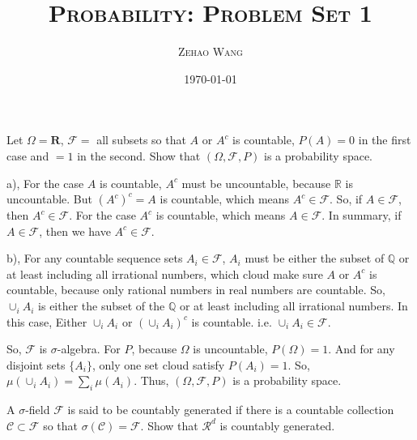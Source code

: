 \documentclass[en, normal, 11pt, black]{elegantnote}
\title{\textsc{Probability: Problem Set 1}}
\author{\textsc{Zehao Wang}}
\date{\today}
\newenvironment{exercise}[1]{\begin{tcolorbox}[colback=black!15, colframe=black!80, breakable, title=#1]}{\end{tcolorbox}}
\renewenvironment{proof}{\begin{tcolorbox}[colback=white, colframe=black!50, breakable, title=Proof. ]\setlength{\parskip}{0.8em}}{\\\rightline{$\square$}\end{tcolorbox}}
\begin{document}
\maketitle
    \begin{exercise}{1.1.1}
        Let $\Omega=\mathbf{R}$, $\mathcal{F}=$ all subsets so that $A$ or $A^c$ is countable, $P(A) = 0$ in the first case and $= 1$ in the second. Show that $(\Omega,\mathcal{F},P)$ is a probability space. 
    \end{exercise}
    \begin{proof}
        a), For the case $A$ is countable, $A^c$ must be uncountable, because $\mathbb{R}$ is uncountable. But $(A^c)^c=A$ is countable, which means $A^c\in\mathcal{F}$. So, if $A\in\mathcal{F}$, then $A^c\in\mathcal{F}$. For the case $A^c$ is countable, which means $A\in\mathcal{F}$. In summary, if $A\in\mathcal{F}$, then we have $A^c\in\mathcal{F}$. 

        b), For any countable sequence sets $A_i\in\mathcal{F}$, $A_i$ must be either the subset of $\mathbb{Q}$ or at least including all irrational numbers, which cloud make sure $A$ or $A^c$ is countable, because only rational numbers in real numbers are countable. So, $\cup_iA_i$ is either the subset of the $\mathbb{Q}$ or at least including all irrational numbers. In this case, Either $\cup_iA_i$ or $(\cup_iA_i)^c$ is countable. i.e. $\cup_iA_i\in\mathcal{F}$. 

        So, $\mathcal{F}$ is $\sigma$-algebra. For $P$, because $\Omega$ is uncountable, $P(\Omega)=1$. And for any disjoint sets $\{A_i\}$, only one set cloud satisfy $P(A_i)=1$. So, $\mu(\cup_iA_i)=\sum_i\mu(A_i)$. Thus, $(\Omega,\mathcal{F},P)$ is a probability space. 
    \end{proof}
    
    \begin{exercise}{1.1.3}
        A $\sigma$-field $\mathcal{F}$ is said to be countably generated if there is a countable collection $\mathcal{C} \subset \mathcal{F}$ so that $\sigma(\mathcal{C}) = \mathcal{F}$. Show that $\mathcal{R}^d$ is countably generated. 
    \end{exercise}
\end{document}
